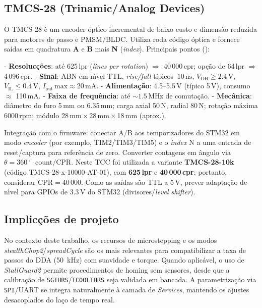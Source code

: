 \subsection{TMCS-28 (Trinamic/Analog Devices)}

O TMCS-28 \`e um encoder \'{o}ptico incremental de baixo custo e dimens\~ao
reduzida para motores de passo e PMSM/BLDC. Utiliza roda c\'odigo \'{o}ptica
e fornece sa\'idas em quadratura \textbf{A} e \textbf{B} mais \textbf{N}
(\emph{index}). Principais pontos (\cite{tmcs28_datasheet}):

- \textbf{Resoluc\c{c}\~oes}: at\'e 625\,lpr (\emph{lines per rotation}) \(\Rightarrow\)
  40\,000\,cpr; op\c{c}\~ao de 64\,lpr \(\Rightarrow\) 4\,096\,cpr.
- \textbf{Sinal}: ABN em n\'{\i}vel TTL, \emph{rise/fall} t\'ipicos \(~10\,\text{ns}\),
  \(V_\text{OH} \ge 2.4\,\text{V}\), \(V_\text{IL} \le 0.4\,\text{V}\), \(I_\text{out}\,\text{max}\approx 20\,\text{mA}\).
- \textbf{Alimenta\c{c}\~ao}: 4.5--5.5\,V (t\'ipico 5\,V), consumo \(\approx\) 110\,mA.
- \textbf{Faixa de frequ\^encia}: at\'e \(\sim 1.5\,\text{MHz}\) de comuta\c{c}\~ao.
- \textbf{Mec\^anica}: di\^ametro do furo 5\,mm ou 6.35\,mm; carga axial 50\,N,
  radial 80\,N; rota\c{c}\~ao m\'axima 6000\,rpm; m\'odulo 28\,mm\,\(\times\)\,28\,mm\,\(\times\)\,18\,mm (aprox.).

Integra\c{c}\~ao com o firmware: conectar A/B aos temporizadores do STM32 em modo
\emph{encoder} (por exemplo, TIM2/TIM3/TIM5) e o \emph{index} N a uma entrada
de reset/captura para refer\^encia de zero. Converter contagens em \^angulo via
\(\theta = 360\,^{\circ} \cdot \text{count}/\text{CPR}\). Neste TCC foi utilizada a
variante \textbf{TMCS-28-10k} (c\'odigo TMCS-28-x-10000-AT-01), com
\textbf{625\,lpr} e \textbf{40\,000\,cpr}; portanto, considerar \(\text{CPR}=40\,000\).
Como as sa\'idas s\~ao TTL a 5\,V, prever adapta\c{c}\~ao
de n\'{\i}vel para GPIOs de 3.3\,V do STM32 (divisores/\emph{level shifter}).

\subsection{Implic\c{c}\~oes de projeto}

No contexto deste trabalho, os recursos de microstepping e os modos
\textit{stealthChop2}/\textit{spreadCycle} s\~ao os mais relevantes para
compatibilizar a taxa de passos do DDA (\SI{50}{\kilo\hertz}) com suavidade e
torque. Quando aplic\'avel, o uso de \textit{StallGuard2} permite
procedimentos de homing sem sensores, desde que a calibra\c{c}\~ao de
\texttt{SGTHRS}/\texttt{TCOOLTHRS} seja validada em bancada. A parametriza\c{c}\~ao
via \texttt{SPI}/UART se integra naturalmente \`a camada de \emph{Services},
mantendo os ajustes desacoplados do la\c{c}o de tempo real.
